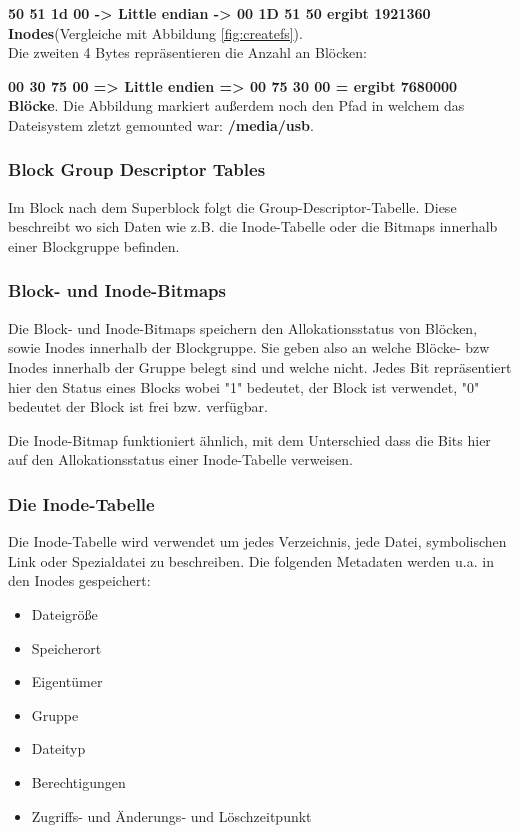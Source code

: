 \textbf{50 51 1d 00 -> Little endian -> 00 1D 51 50 ergibt 1921360 Inodes}(Vergleiche mit Abbildung \ref{fig:createfs}).\\Die zweiten 4 Bytes repräsentieren die Anzahl an Blöcken:

\textbf{00 30 75 00 => Little endien => 00 75 30 00 = ergibt 7680000 Blöcke}. Die Abbildung markiert außerdem noch den Pfad in welchem das Dateisystem zletzt gemounted war: \textbf{/media/usb}.


\subsubsection{Block Group Descriptor Tables}
Im Block nach dem Superblock folgt die Group-Descriptor-Tabelle. Diese beschreibt wo sich Daten wie z.B. die Inode-Tabelle oder die Bitmaps innerhalb einer Blockgruppe befinden. 


\subsubsection{Block- und Inode-Bitmaps}
Die Block- und Inode-Bitmaps speichern den Allokationsstatus von Blöcken, sowie Inodes innerhalb der Blockgruppe. Sie geben also an welche Blöcke- bzw Inodes innerhalb der Gruppe belegt sind und welche nicht. Jedes Bit repräsentiert hier den Status eines Blocks wobei "1" bedeutet, der Block ist verwendet, "0" bedeutet der Block ist frei bzw. verfügbar.

Die Inode-Bitmap funktioniert ähnlich, mit dem Unterschied dass die Bits hier auf den Allokationsstatus einer Inode-Tabelle verweisen.

\subsubsection{Die Inode-Tabelle}

Die Inode-Tabelle wird verwendet um jedes Verzeichnis, jede Datei, symbolischen Link oder Spezialdatei zu beschreiben. Die folgenden Metadaten werden u.a. in den Inodes gespeichert:

\begin{itemize}
	\item Dateigröße
	\item Speicherort
	\item Eigentümer
	\item Gruppe
	\item Dateityp
	\item Berechtigungen
	\item Zugriffs- und Änderungs- und Löschzeitpunkt
\end{itemize}

